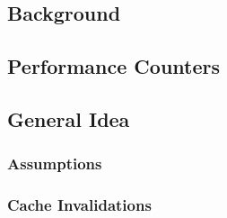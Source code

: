 \subsection{Background}




\subsection{Performance Counters}

\subsection{General Idea}


\subsubsection{Assumptions}

\subsubsection{Cache Invalidations}
